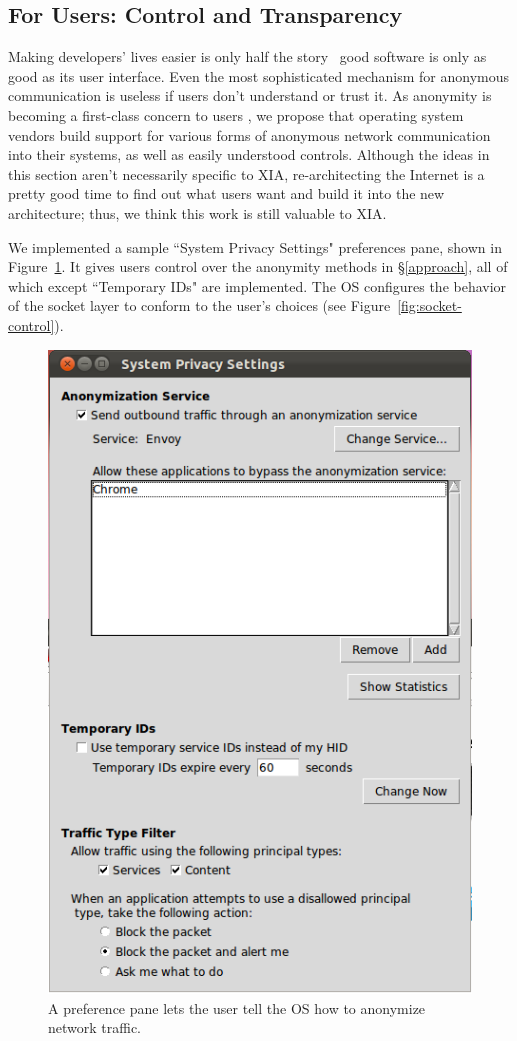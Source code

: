 \documentclass{article}
\begin{document}
\subsection{For Users: Control and Transparency}
\label{control}
Making developers' lives easier is only half the story \textemdash~good software is only as good as its user interface. Even the most sophisticated mechanism for anonymous communication is useless if users don't understand or trust it. As anonymity is becoming a first-class concern to users \cite{user-study}, we propose that operating system vendors build support for various forms of anonymous network communication into their systems, as well as easily understood controls. Although the ideas in this section aren't necessarily specific to XIA, re-architecting the Internet is a pretty good time to find out what users want and build it into the new architecture; thus, we think this work is still valuable to XIA.

We implemented a sample ``System Privacy Settings" preferences pane, shown in Figure~\ref{fig:settings}. It gives users control over the anonymity methods in \S\ref{approach}, all of which except ``Temporary IDs" are implemented. The OS configures the behavior of the socket layer to conform to the user's choices (see Figure~\ref{fig:socket-control}).

\begin{figure}
\centering
\includegraphics[scale=0.5]{images/privacy-settings.png}
\caption{A preference pane lets the user tell the OS how to anonymize network traffic.}
\label{fig:settings}
\end{figure}
\end{document}
